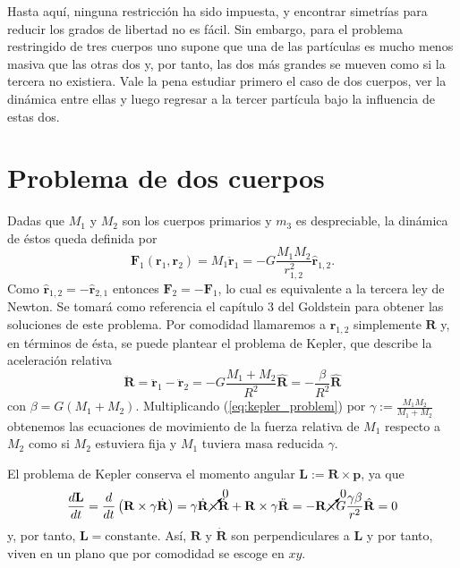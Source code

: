 Hasta aquí, ninguna restricción ha sido impuesta, y encontrar simetrías para reducir los grados de libertad no es fácil. Sin embargo, para el problema restringido de tres cuerpos uno supone que una de las partículas es mucho menos masiva que las otras dos y, por tanto, las dos más grandes se mueven como si la tercera no existiera. Vale la pena estudiar primero el caso de dos cuerpos, ver la dinámica entre ellas y luego regresar a la tercer partícula bajo la influencia de estas dos. 

\section{Problema de dos cuerpos}
\label{sec:2body_problem}
Dadas que $M_1$ y $M_2$ son los cuerpos primarios y $m_3$ es despreciable, la dinámica de éstos queda definida por
\begin{equation}
 \mathbf{F}_1(\mathbf{r}_1,\mathbf{r}_2) = M_1 \ddot{\mathbf{r}}_1 = -G \frac{M_1 M_2}{r_{1,2}^2} \hat{\mathbf{r}}_{1,2}.
 \label{eq:2body_eqs_motion}
\end{equation}
Como $\hat{\mathbf{r}}_{1,2} = - \hat{\mathbf{r}}_{2,1}$ entonces $\mathbf{F}_2 = -\mathbf{F}_1$, lo cual es equivalente a la tercera ley de Newton. Se tomará como referencia el capítulo 3 del Goldstein \cite{Goldstein2007} para obtener las soluciones de este problema. Por comodidad llamaremos a $\mathbf{r}_{1,2}$ simplemente $\mathbf{R}$ y, en términos de ésta, se puede plantear el problema de Kepler, que describe la aceleración relativa
\begin{equation}
 \ddot{\mathbf{R}} = \ddot{\mathbf{r}}_1 - \ddot{\mathbf{r}}_2 = -G \frac{M_1 + M_2}{R^2} \hat{\mathbf{R}} = - \frac{\beta}{R^2}\hat{\mathbf{R}}
 \label{eq:kepler_problem}
\end{equation}
con $\beta = G \left(M_1 + M_2 \right)$. Multiplicando (\ref{eq:kepler_problem}) por $\gamma := \frac{M_1 M_2}{M_1+M_2}$ obtenemos las ecuaciones de movimiento de la fuerza relativa de $M_1$ respecto a $M_2$ como si $M_2$ estuviera fija y $M_1$ tuviera masa reducida $\gamma$.

El problema de Kepler conserva el momento angular $\mathbf{L} := \mathbf{R} \times \mathbf{p}$, ya que
\begin{equation}
 \frac{d\mathbf{L}}{dt} = \frac{d}{dt}\left(\mathbf{R} \times \gamma\dot{\mathbf{R}} \right) = \gamma\dot{\mathbf{R}} \cancelto{0}{\times}\dot{\mathbf{R}} + \mathbf{R} \times \gamma \ddot{\mathbf{R}} = - \mathbf{R} \cancelto{0}{\times} G\frac{\gamma \beta}{r^2}\hat{\mathbf{R}} = 0
\end{equation}
y, por tanto, $\mathbf{L} = \text{constante}$. Así, $\mathbf{R}$ y $\dot{\mathbf{R}}$ son perpendiculares a $\mathbf{L}$ y por tanto, viven en un plano que por comodidad se escoge en $xy$. 

